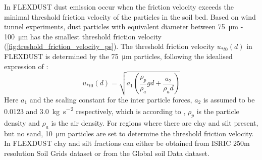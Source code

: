 In FLEXDUST dust emission occur when the friction velocity exceeds the minimal threshold 
friction velocity of the particles in the soil bed. Based on wind tunnel experiments, dust 
particles with equivalent diameter between \SI{75}{\micro\metre} - \SI{100}{\micro\metre} has 
the smallest threshold friction velocity (\cref{fig:treshold_friction_velocity_ps}). The 
threshold friction velocity $u_{*t0}(d)$ in FLEXDUST is determined by the 
\SI{75}{\micro\metre} particles, following the idealised expression of \textcite{shao2000simple}:
\begin{equation}
    u_{*t0}(d) = \sqrt{a_1 \left(\frac{\rho_p}{\rho_a}gd+\frac{a_2}{\rho_ad}\right)} 
\end{equation}
Here $a_1$ and the scaling constant for the inter particle forces, $a_2$  is assumed to be 0.0123 and \SI{3.0}{\kg\per\s\squared} respectively, which is  
according to \textcite{shao2000simple}, $\rho_p$ is the particle density and $\rho_a$ is the air density. 
For regions where there are clay and silt present, but no sand, \SI{10}{\micro\metre} 
particles are set to determine the threshold friction velocity. In FLEXDUST clay and 
silt fractions can either be obtained from ISRIC 250m resolution Soil Grids dataset 
\parencite{soil-grid_ref} or from the Global soil Data \cite{task2014global} dataset. 

